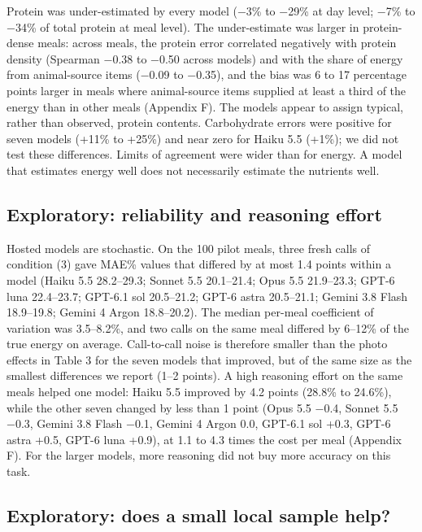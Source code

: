 \documentclass[
  11pt,
  letterpaper]{article}
\begin{document}
Protein was under-estimated by every model (−3\% to −29\% at day level; −7\% to −34\% of total protein at meal
level). The under-estimate was larger in protein-dense meals: across meals, the protein error correlated
negatively with protein density (Spearman −0.38 to −0.50 across models) and with the share of energy from
animal-source items (−0.09 to −0.35), and the bias was 6 to 17 percentage points larger in meals where
animal-source items supplied at least a third of the energy than in other meals (Appendix F). The models
appear to assign typical, rather than observed, protein contents. Carbohydrate errors were positive for seven
models (+11\% to +25\%) and near zero for Haiku 5.5 (+1\%); we did not test these differences. Limits of
agreement were wider than for energy. A model that estimates energy well does not necessarily estimate the
nutrients well.

\subsection{Exploratory: reliability and reasoning effort}\label{exploratory-reliability-and-reasoning-effort}

Hosted models are stochastic. On the 100 pilot meals, three fresh calls of condition (3) gave MAE\% values
that differed by at most 1.4 points within a model (Haiku 5.5 28.2--29.3; Sonnet 5.5 20.1--21.4; Opus 5.5
21.9--23.3; GPT-6 luna 22.4--23.7; GPT-6.1 sol 20.5--21.2; GPT-6 astra 20.5--21.1; Gemini 3.8 Flash
18.9--19.8; Gemini 4 Argon 18.8--20.2). The median per-meal coefficient of variation was 3.5--8.2\%, and two
calls on the same meal differed by 6--12\% of the true energy on average. Call-to-call noise is therefore
smaller than the photo effects in Table 3 for the seven models that improved, but of the same size as the
smallest differences we report (1--2 points). A high reasoning effort on the same meals helped one model:
Haiku 5.5 improved by 4.2 points (28.8\% to 24.6\%), while the other seven changed by less than 1 point (Opus
5.5 −0.4, Sonnet 5.5 −0.3, Gemini 3.8 Flash −0.1, Gemini 4 Argon 0.0, GPT-6.1 sol +0.3, GPT-6 astra +0.5,
GPT-6 luna +0.9), at 1.1 to 4.3 times the cost per meal (Appendix F). For the larger models, more reasoning
did not buy more accuracy on this task.

\subsection{Exploratory: does a small local sample help?}\label{exploratory-does-a-small-local-sample-help}
\end{document}
